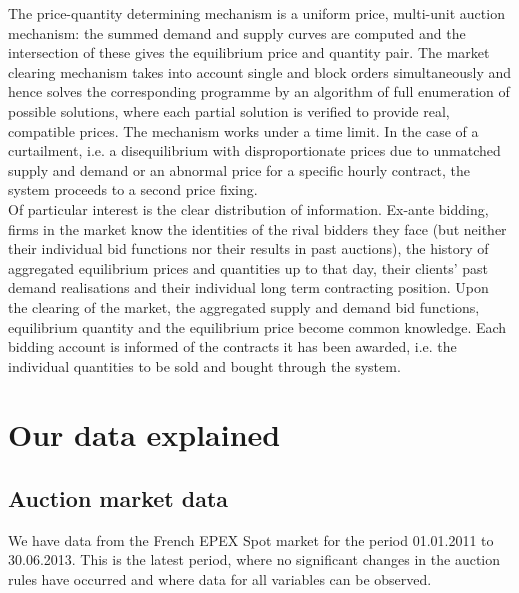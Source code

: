 The price-quantity determining mechanism is a uniform price, multi-unit auction mechanism: the summed demand and supply curves are computed and the intersection of these gives the equilibrium price and quantity pair. The market clearing mechanism takes into account single and block orders simultaneously and hence solves the corresponding programme by an algorithm of full enumeration of possible solutions, where each partial solution is verified to provide real, compatible prices. %
The mechanism works under a time limit. In the case of a curtailment, i.e. a disequilibrium with disproportionate prices due to unmatched supply and demand or an abnormal price for a specific hourly contract, the system proceeds to a second price fixing. \\

Of particular interest is the clear distribution of information. Ex-ante bidding, firms in the market know the identities of the rival bidders they face (but neither their individual bid functions nor their results in past auctions), the history of aggregated equilibrium prices and quantities up to that day, their clients' past demand realisations and their individual long term contracting position. Upon the clearing of the market, the aggregated supply and demand bid functions, equilibrium quantity and the equilibrium price become common knowledge. Each bidding account is informed of the contracts it has been awarded, i.e. the individual quantities to be sold and bought through the system.


\section{Our data explained}

\label{pschapter}

\label{datasection}
\subsection*{Auction market data}
We have data from the French EPEX Spot market for the period 01.01.2011 to 30.06.2013. This is the latest period, where no significant changes in the auction rules have occurred and where data for all variables can be observed. \\

